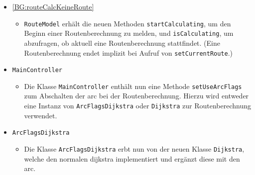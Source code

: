 \documentclass[a4paper, 11pt]{article}
\newcommand{\code}[1]{\texttt{#1}}
\begin{document}
\begin{itemize}
\item\label{change:routeCalcKeineRoute} \ref{BG:routeCalcKeineRoute}
  \begin{itemize}
  \item \code{RouteModel} erhält die neuen Methoden \code{startCalculating}, um den Beginn einer Routenberechnung zu melden, und \code{isCalculating}, um abzufragen, ob aktuell eine Routenberechnung stattfindet.
  (Eine Routenberechnung endet implizit bei Aufruf von \code{setCurrentRoute}.)
  \end{itemize}
  \item \code{MainController}
    \begin{itemize}
    \item Die Klasse \code{MainController} enthält nun eine Methode \code{setUseArcFlags} zum Abschalten der \gls{arc} bei der Routenberechnung. Hierzu wird entweder eine Instanz von \code{ArcFlagsDijkstra} oder \code{Dijkstra} zur Routenberechnung verwendet.
    \end{itemize}
  \item \code{ArcFlagsDijkstra}
    \begin{itemize}
    \item Die Klasse \code{ArcFlagsDijkstra} erbt nun von der neuen Klasse \code{Dijkstra}, welche den normalen \gls{dijkstra} implementiert und ergänzt diese mit den \gls{arc}.
    \end{itemize}
\end{itemize}


\makeatletter
{}
\makeatother
\printglossary[type=main, title={Glossar}, toctitle={Glossar}, style=myAltlist]
\end{document}
